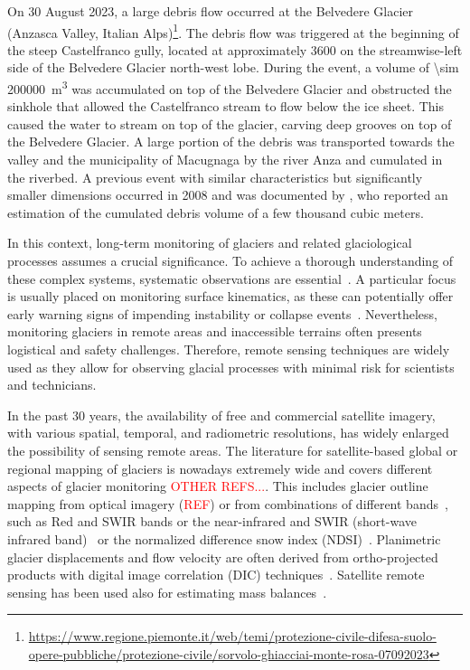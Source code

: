 On 30 August 2023, a large debris flow occurred at the Belvedere Glacier (Anzasca Valley, Italian Alps)\footnote{\url{https://www.regione.piemonte.it/web/temi/protezione-civile-difesa-suolo-opere-pubbliche/protezione-civile/sorvolo-ghiacciai-monte-rosa-07092023}}.
The debris flow was triggered at the beginning of the steep Castelfranco gully, located at approximately \SI{3600}{\masl} on the streamwise-left side of the Belvedere Glacier north-west lobe.
During the event, a volume of \SI{\sim 200000}{\cubic\meter} was accumulated on top of the Belvedere Glacier and obstructed the sinkhole that allowed the Castelfranco stream to flow below the ice sheet. 
This caused the water to stream on top of the glacier, carving deep grooves on top of the Belvedere Glacier. 
A large portion of the debris was transported towards the valley and the municipality of Macugnaga by the river Anza and cumulated in the riverbed.
A previous event with similar characteristics but significantly smaller dimensions occurred in 2008 and was documented by \cite{Mortara2009_ghiacciaoBelvedere}, who reported an estimation of the cumulated debris volume of a few thousand cubic meters.

In this context, long-term monitoring of glaciers and related glaciological processes assumes a crucial significance.
To achieve a thorough understanding of these complex systems, systematic observations are essential~\citep{Kaab2005}.
A particular focus is usually placed on monitoring surface kinematics, as these can potentially offer early warning signs of impending instability or collapse events~\citep{Faillettaz2015}.
Nevertheless, monitoring glaciers in remote areas and inaccessible terrains often presents logistical and safety challenges.
Therefore, remote sensing techniques are widely used as they allow for observing glacial processes with minimal risk for scientists and technicians. 

In the past 30 years, the availability of free and commercial satellite imagery, with various spatial, temporal, and radiometric resolutions, has widely enlarged the possibility of sensing remote areas.
The literature for satellite-based global or regional mapping of glaciers is nowadays extremely wide and covers different aspects of glacier monitoring \citep{Paul2007} \textcolor{red}{OTHER REFS...}. 
This includes glacier outline mapping from optical imagery (\textcolor{red}{REF}) or from combinations of different bands~\citep{Winsvold2016}, such as Red and SWIR bands or the near-infrared and SWIR (short-wave infrared band)~\citep{Paul_2002} or the normalized difference snow index (NDSI)~\citep{Hall1995}.
Planimetric glacier displacements and flow velocity are often derived from ortho-projected products with digital image correlation (DIC) techniques~\citep{Scambos1992, Kaab2005, Scherler2008, altena_kaab_2020}. 
Satellite remote sensing has been used also for estimating mass balances~\citep{Bamber2007, Berthier2016, Rabatel2017, Berthier2023}.


